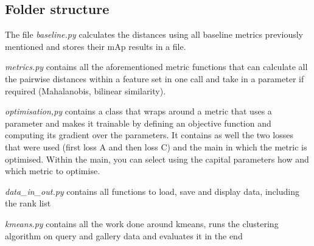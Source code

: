 \documentclass[10pt,technote]{IEEEtran}
\begin{document}
\subsection{Folder structure}
\begin{list}
    \item The file \textit{baseline.py} calculates the distances using all baseline metrics previously mentioned and stores their mAp results in a file.
    \item \textit{metrics.py} contains all the aforementioned metric functions that can calculate all the pairwise distances within a feature set in one call and take in a parameter if required (Mahalanobis, bilinear similarity). 
    \item \textit{optimisation,py} contains a class that wraps around a metric that uses a parameter and makes it trainable by defining an objective function and computing its gradient over the parameters. It contains as well the two losses that were used (first loss A and then loss C) and the main in which the metric is optimised. Within the main, you can select using the capital parameters how and which metric to optimise.
    \item \textit{data_in_out.py} contains all functions to load, save and display data, including the rank list
    \item \textit{kmeans.py} contains all the work done around kmeans, runs the clustering algorithm on query and gallery data and evaluates it in the end
\end{list}





\end{document}
